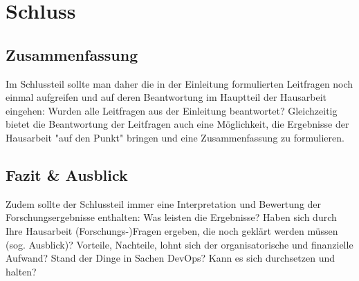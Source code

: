 \chapter{Schluss} %

\section{Zusammenfassung}

Im Schlussteil sollte man daher die in der Einleitung formulierten Leitfragen noch einmal aufgreifen und auf deren Beantwortung im Hauptteil der Hausarbeit eingehen: Wurden alle Leitfragen aus der Einleitung beantwortet?
Gleichzeitig bietet die Beantwortung der Leitfragen auch eine Möglichkeit, die Ergebnisse der Hausarbeit "auf den Punkt" bringen und eine Zusammenfassung zu formulieren.

\section{Fazit \& Ausblick}

Zudem sollte der Schlussteil immer eine Interpretation und Bewertung der Forschungsergebnisse enthalten: Was leisten die Ergebnisse? Haben sich durch Ihre Hausarbeit (Forschungs-)Fragen ergeben, die noch geklärt werden müssen (sog. Ausblick)?
Vorteile, Nachteile, lohnt sich der organisatorische und finanzielle Aufwand?
Stand der Dinge in Sachen DevOps? Kann es sich durchsetzen und halten?

